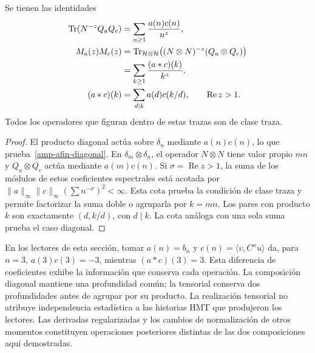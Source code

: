 \begin{proposition}
\label{amp-afin-prop-productos}
Se tienen las identidades
\begin{align}
 \operatorname{Tr}(N^{-z}Q_aQ_c)
 &=\sum_{n\geq1}\frac{a(n)c(n)}{n^z},
 \label{amp-afin-diagonal}\\
 M_a(z)M_c(z)
 &=\operatorname{Tr}_{\mathcal H\otimes\mathcal H}
 \bigl((N\otimes N)^{-z}(Q_a\otimes Q_c)\bigr)\notag\\
 &=\sum_{k\geq1}\frac{(a*c)(k)}{k^z},
 \label{amp-afin-tensor}\\
 (a*c)(k)&=\sum_{d\mid k}a(d)c(k/d),
 \qquad \operatorname{Re}z>1.
 \label{amp-afin-convolucion}
\end{align}
Todos los operadores que figuran dentro de estas trazas son de clase traza.
\end{proposition}
\begin{proof}
El producto diagonal actúa sobre $\delta_n$ mediante
$a(n)c(n)$, lo que prueba~\eqref{amp-afin-diagonal}.
En $\delta_m\otimes\delta_n$, el operador $N\otimes N$
tiene valor propio $mn$ y $Q_a\otimes Q_c$ actúa mediante
$a(m)c(n)$. Si $\sigma=\operatorname{Re}z>1$, la suma de los
módulos de estos coeficientes espectrales está acotada por
$\|a\|_\infty\|c\|_\infty(\sum n^{-\sigma})^2<\infty$.
Esta cota prueba la condición de clase traza y permite factorizar
la suma doble o agruparla por $k=mn$. Los pares con producto $k$
son exactamente $(d,k/d)$, con $d\mid k$.
La cota análoga con una sola suma prueba el caso diagonal.
\end{proof}

En los lectores de esta sección, tomar $a(n)=b_n$ y
$c(n)=\langle v,C^nu\rangle$ da, para $n=3$,
$a(3)c(3)=-3$, mientras $(a*c)(3)=3$.
Esta diferencia de coeficientes exhibe la información que conserva
cada operación. La composición diagonal mantiene una profundidad común;
la tensorial conserva dos profundidades antes de agrupar por su producto.
La realización tensorial no atribuye independencia estadística a las
historias HMT que produjeron los lectores. Las derivadas regularizadas y
los cambios de normalización de otros momentos constituyen operaciones
posteriores distintas de las dos composiciones aquí demostradas.

